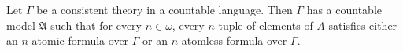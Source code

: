 Let $\Gamma$ be a consistent theory in a countable language. Then $\Gamma$ has a countable model $\mathfrak{A}$ such that for every $n \in \omega$, every $n$-tuple of elements of $A$ satisfies either an $n$-atomic formula over $\Gamma$ or an $n$-atomless formula over $\Gamma$.
